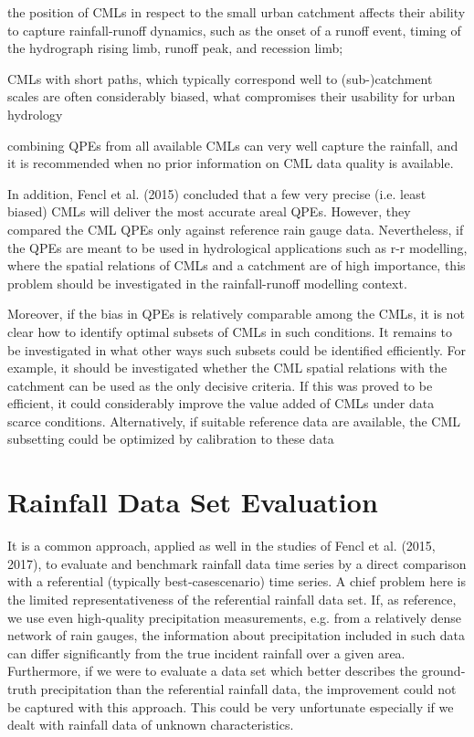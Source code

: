 \documentclass{ctuthesis}\usepackage[]{graphicx}\usepackage[]{color}
\begin{document}
the position of CMLs in respect to the small urban catchment affects their ability to capture rainfall-runoff dynamics, such as the onset of a runoff event, timing of the hydrograph rising limb, runoff peak, and recession limb;

CMLs with short paths, which typically correspond well to (sub-)catchment scales are often considerably biased, what compromises their usability for urban hydrology

combining QPEs from all available CMLs can very well capture the rainfall, and it is recommended when no prior information on CML data quality is available.

In addition, Fencl et al. (2015) concluded that a few very precise (i.e. least biased) CMLs will deliver the most accurate areal QPEs. However, they compared the CML QPEs only against reference rain gauge data. Nevertheless, if the QPEs are meant to be used in hydrological applications such as r-r modelling, where the spatial relations of CMLs and a catchment are of high importance, this problem should be investigated in the rainfall-runoff modelling context.

Moreover, if the bias in QPEs is relatively comparable among the CMLs, it is not clear how to identify optimal subsets of CMLs in such conditions. It remains to be investigated in what other ways such subsets could be identified efficiently. 
For example, it should be investigated whether the CML spatial relations with the catchment can be used as the only decisive criteria. If this was proved to be efficient, it could considerably improve the value added of CMLs under data scarce conditions.
Alternatively, if suitable reference data are available, the CML subsetting could be optimized by calibration to these data



\section{Rainfall Data Set Evaluation}

It is a common approach, applied as well in the studies of Fencl et al. (2015, 2017), to evaluate and
benchmark rainfall data time series by a direct comparison with a referential (typically best‐casescenario)
time series. A chief problem here is the limited representativeness of the referential rainfall
data set. If, as reference, we use even high‐quality precipitation measurements, e.g. from a relatively
dense network of rain gauges, the information about precipitation included in such data can differ
significantly from the true incident rainfall over a given area. Furthermore, if we were to evaluate a
data set which better describes the ground‐truth precipitation than the referential rainfall data, the
improvement could not be captured with this approach. This could be very unfortunate especially if
we dealt with rainfall data of unknown characteristics.
\end{document}
